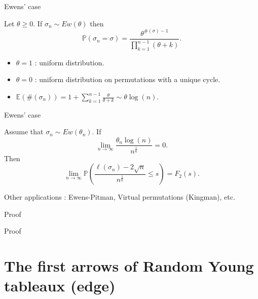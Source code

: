 \documentclass[english]{beamer}
\begin{document}
\begin{frame}{Ewens' case}
\begin{definition}
Let $\theta\geq 0$. If $\sigma_n\sim Ew(\theta)$ then
\begin{equation*}
\mathbb{P}(\sigma_n=\sigma)=\frac{\theta^{\#(\sigma)-1}}{\prod_{k=1}^{n-1}(\theta+k)}.\end{equation*}
\end{definition}
\vspace{5 mm}

\begin{itemize}
\item $\theta=1$ :  uniform distribution.
\item $\theta=0$ : uniform distribution on permutations with a unique cycle. 
\item $\mathbb{E}(\#(\sigma_n))= 1+\sum_{k=1}^{n-1} \frac{\theta}{\theta+k}\sim \theta \log(n).$
\end{itemize}
\end{frame}
\begin{frame}{Ewens' case}
\begin{corollary} \label{2.1}
Assume that $\sigma_n\sim Ew(\theta_n)$. If
\begin{equation}\tag{H'2}\label{ewcond}
\lim_{n\to \infty} \frac{\theta_n \log(n)  }{n^\frac 1 6}=0.
\end{equation}
Then 
\begin{equation}  \tag{TW}
\lim_{n\to \infty} \mathbb{P}\left(\frac{\ell(\sigma_n)-2\sqrt{n}}{n^\frac 16}\leq s\right)=F_2(s).
\end{equation}
\end{corollary}
\vspace{10 mm }
Other applications : Ewens-Pitman, Virtual permutations (Kingman), etc.
\end{frame}
\begin{frame}{Proof}
\end{frame}
\begin{frame}{Proof}

\end{frame}

\section{The first arrows of Random Young tableaux (edge)}
\end{document}
